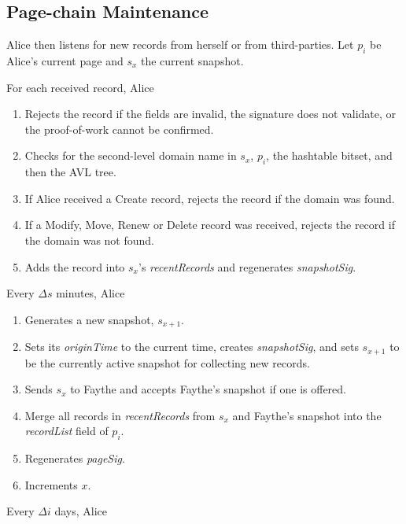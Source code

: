 \subsection{Page-chain Maintenance}

Alice then listens for new records from herself or from third-parties. Let $ p_{i} $ be Alice's current page and $ s_{x} $ the current snapshot.

For each received record, Alice

\begin{enumerate}
	\item Rejects the record if the fields are invalid, the signature does not validate, or the proof-of-work cannot be confirmed.
	\item Checks for the second-level domain name in $ s_{x} $, $ p_{i} $, the hashtable bitset, and then the AVL tree.
	\item If Alice received a Create record, rejects the record if the domain was found.
	\item If a Modify, Move, Renew or Delete record was received, rejects the record if the domain was not found.
	\item Adds the record into $ s_{x} $'s \emph{recentRecords} and regenerates \emph{snapshotSig}.
\end{enumerate}

Every $ \Delta s $ minutes, Alice

\begin{enumerate}
	\item Generates a new snapshot, $ s_{x+1} $.
	\item Sets its \emph{originTime} to the current time, creates \emph{snapshotSig}, and sets $ s_{x+1} $ to be the currently active snapshot for collecting new records.
	\item Sends $ s_{x} $ to Faythe and accepts Faythe's snapshot if one is offered.
	\item Merge all records in \emph{recentRecords} from $ s_{x} $ and Faythe's snapshot into the \emph{recordList} field of $ p_{i} $.
	\item Regenerates \emph{pageSig}.
	\item Increments $ x $.
\end{enumerate}

Every $ \Delta i $ days, Alice

